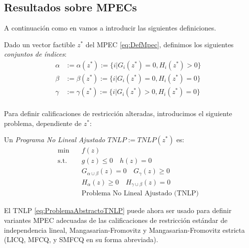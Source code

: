 \subsection{Resultados sobre MPECs}

A continuación como en \cite{Flegel2003AFJ} vamos a  introducir las siguientes definiciones.
\begin{definition}
Dado un vector factible $z^*$ del MPEC \eqref{eq:DefMpec}, definimos los siguientes \textit{conjuntos de índices}:
\begin{equation}
\begin{aligned}
\alpha &:= \alpha(z^*) := \{i|G_i(z^*) = 0, H_i(z^*) > 0\} \\
\beta &:= \beta(z^*) := \{i|G_i(z^*) = 0, H_i(z^*) = 0\}  \\
\gamma &:= \gamma(z^*) := \{i|G_i(z^*) > 0, H_i(z^*) = 0\}  \\
\end{aligned}
\label{eq:ConjuntoDeIndices} 
\end{equation}
\end{definition}

Para definir calificaciones de restricción alteradas, introducimos el siguiente problema, dependiente de $z^*$:

\begin{definition}

Un \textit{Programa No Lineal Ajustado $TNLP := TNLP(z^*)$} es:
\begin{equation}
\begin{aligned} 
\min \quad & f(z) \\
\text{s.t.} \quad & g(z) \leq 0 \quad h(z) = 0  \\
& G_{\alpha \cup \beta}(z) = 0 \quad G_{\gamma}(z) \geq 0  \\
& H_{\alpha}(z) \geq 0 \quad H_{\gamma \cup \beta}(z) = 0  \\
& \text{Problema No Lineal Ajustado (TNLP)}  
\end{aligned}
\label{eq:ProblemaAbstractoTNLP}
\end{equation}
    
\end{definition}

El TNLP \eqref{eq:ProblemaAbstractoTNLP} puede ahora ser usado para definir variantes MPEC adecuadas de las calificaciones de restricción estándar de independencia lineal, Mangasarian-Fromovitz y Mangasarian-Fromovitz estricta (LICQ, MFCQ, y SMFCQ en su forma abreviada).

